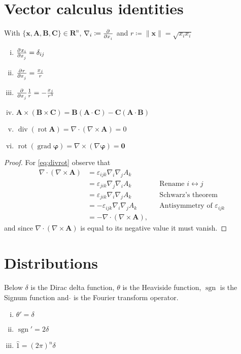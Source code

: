 \documentclass[a4paper, 11pt]{scrartcl}
\begin{document}
\section*{Vector calculus identities}

With $\{\mathbf{x}, \mathbf{A}, \mathbf{B}, \mathbf{C}\} \in \mathbf{R}^n$, $\nabla_i \coloneqq \pd{}{x_i}$ and $r \coloneqq \|\mathbf{x}\| = \sqrt{x_i x_i}$
\begin{enumerate}[(i)]
  \item $\pd{x_i}{x_j}=\delta_{ij}$
  \item $\pd{r}{x_j}=\frac{x_j}{r}$
  \item $\pd{}{x_j}\frac{1}{r}=-\frac{x_j}{r^3}$
  \item $\mathbf{A}\times(\mathbf{B}\times\mathbf{C}) = \mathbf{B}(\mathbf{A}\cdot\mathbf{C})-\mathbf{C}(\mathbf{A}\cdot\mathbf{B})$
  \item $\operatorname{div}(\operatorname{rot}\mathbf{A}) =
  \nabla\cdot(\nabla\times\mathbf{A}) = 0\label{eq:divrot}$
  \item $\operatorname{rot}(\operatorname{grad}\mathbf{\varphi}) =
  \nabla\times(\nabla\mathbf{\varphi}) = \mathbf{0}\label{eq:rotgrad}$
\end{enumerate}

\begin{proof}
  For \eqref{eq:divrot} observe that
  \begin{align*}
    \nabla\cdot(\nabla\times\mathbf{A})
    &= \varepsilon_{ijk} \nabla_i \nabla_j A_k \\
    &= \varepsilon_{jik} \nabla_j \nabla_i A_k
    && \text{Rename $i \leftrightarrow j$} \\
    &= \varepsilon_{jik} \nabla_i \nabla_j A_k
    && \text{Schwarz's theorem} \\
    &= -\varepsilon_{ijk} \nabla_i \nabla_j A_k
    && \text{Antisymmetry of $\varepsilon_{ijk}$} \\
    &= -\nabla\cdot(\nabla\times\mathbf{A}),
  \end{align*}
  and since $\nabla\cdot(\nabla\times\mathbf{A})$ is equal to its negative value it must vanish.
\end{proof}

\section*{Distributions}
Below $\delta$ is the Dirac delta function, $\theta$ is the Heaviside function, $\operatorname{sgn}$ is the Signum function and $\hat{}$ is the Fourier transform operator.
\begin{enumerate}[(i)]
  \item $\theta' = \delta$
  \item $\operatorname{sgn}' = 2\delta\label{eq:dsgn}$
  \item $\hat{1} = (2\pi)^n\delta$
\end{enumerate}
\end{document}
